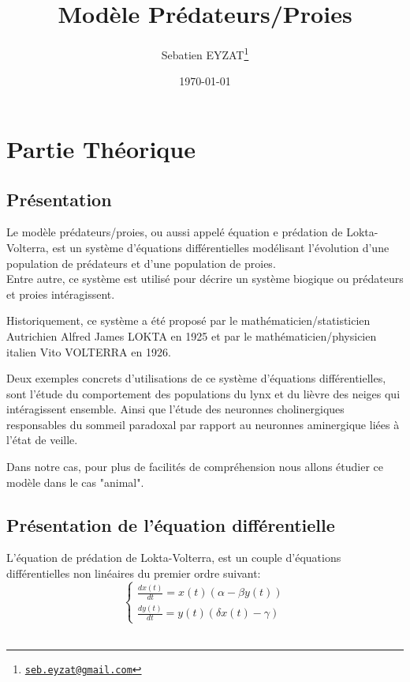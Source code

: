 \documentclass[a4paper,16pt,twoside]{report}
\title{Modèle Prédateurs/Proies}
\date{\today}
\author{Sebatien EYZAT\thanks{\href{seb.eyzat@gmail.com}{\tt seb.eyzat@gmail.com}}
}
\begin{document}
\maketitle

\cleardoublepage
\tableofcontents

\chapter{Partie Théorique}
\section{Présentation}
Le modèle prédateurs/proies, ou aussi appelé équation e prédation de Lokta-Volterra, est un système d'équations différentielles modélisant l'évolution d'une population de prédateurs et d'une population de proies.\\
Entre autre, ce système est utilisé pour décrire un système biogique ou prédateurs et proies intéragissent.


Historiquement, ce système a été proposé par le mathématicien/statisticien Autrichien Alfred James LOKTA en 1925 et par le mathématicien/physicien italien Vito VOLTERRA en 1926.


Deux exemples concrets d'utilisations de ce système d'équations différentielles, sont l'étude du comportement des populations du lynx et du lièvre des neiges qui intéragissent ensemble. Ainsi que l'étude des neuronnes cholinergiques responsables du sommeil paradoxal par rapport au neuronnes aminergique liées à l'état de veille.


Dans notre cas, pour plus de facilités de compréhension nous allons étudier ce modèle dans le cas "animal".
\section{Présentation de l'équation différentielle}
L'équation de prédation de Lokta-Volterra, est un couple d'équations différentielles non linéaires du premier ordre suivant:\\
\begin{equation}
   \left\{
    \begin{array}{rcr}
    \frac{dx(t)}{dt}=x(t)(\alpha - \beta y(t))\\
    \frac{dy(t)}{dt}=y(t)(\delta x(t)- \gamma)
    \end{array}
		\right.
\end{equation}\\
\end{document}
